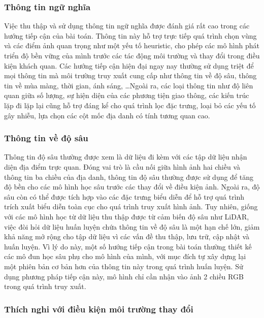 \subsubsection{Thông tin ngữ nghĩa}

Việc thu thập và sử dụng thông tin ngữ nghĩa được đánh giá rất cao trong các hướng tiếp cận của bài toán. Thông tin này hỗ trợ trực tiếp quá trình chọn vùng và các điểm ảnh quan trọng như một yếu tố heuristic, cho phép các mô hình phát triển độ bền vững của mình trước các tác động môi trường và thay đổi trong điều kiện khách quan. Các hướng tiếp cận hiện đại ngay nay thường sử dụng triệt để mọi thông tin mà môi trường truy xuất cung cấp như thông tin về độ sâu, thông tin về mùa màng, thời gian, ánh sáng, \dots Ngoài ra, các loại thông tin như độ liên quan giữa số lượng, sự hiện diện của các phương tiện giao thông, các kiến trúc lặp đi lặp lại cũng hỗ trợ đáng kể cho quá trình lọc đặc trưng, loại bỏ các yếu tố gây nhiễu, lựa chọn các cột mốc địa danh có tính tương quan cao.

\subsubsection{Thông tin về độ sâu}

Thông tin độ sâu thường được xem là dữ liệu đi kèm với các tập dữ liệu nhận diện địa điểm trực quan. Đóng vai trò là cầu nối giữa hình ảnh hai chiều và thông tin ba chiều của địa danh, thông tin độ sâu thường được sử dụng để tăng độ bền cho các mô hình học sâu trước các thay đổi về điều kiện ảnh. Ngoài ra, độ sâu còn có thể được tích hợp vào các đặc trưng biểu diễn để hỗ trợ quá trình trích xuất biểu diễn toàn cục cho quá trình truy xuất hình ảnh. Tuy nhiên, giống với các mô hình học từ dữ liệu thu thập được từ cảm biến độ sâu như LiDAR, việc đòi hỏi dữ liệu huấn luyện chứa thông tin về độ sâu là một hạn chế lớn, giảm khả năng mở rộng cho tập dữ liệu vì các vấn đề thu thập, lưu trữ, cập nhật và huấn luyện. Vì lý do này, một số hướng tiếp cận trong bài toán thường thiết kế các mô đun học sâu phụ cho mô hình của mình, với mục đích tự xây dựng lại một phiên bản cơ bản hơn của thông tin này trong quá trình huấn luyện. Sử dụng phương pháp tiếp cận này, mô hình chỉ cần nhận vào ảnh 2 chiều RGB trong quá trình truy xuất\cite{piasco2019learning}.

\subsubsection{Thích nghi với điều kiện môi trường thay đổi}

